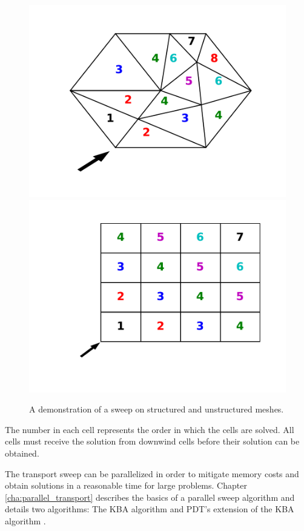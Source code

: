 \begin{figure}[H]
\centering
\includegraphics[scale=0.5]{../figures/UnstructuredMesh.pdf}
\includegraphics[scale = 0.5]{../figures/StructuredMesh.pdf}
\caption{A demonstration of a sweep on structured and unstructured meshes. }
\label{sweeps}
\end{figure}

The number in each cell represents the order in which the cells are solved.
All cells must receive the solution from downwind cells before their solution can be obtained.

The transport sweep can be parallelized in order to mitigate memory costs and obtain solutions in a reasonable time for large problems. Chapter \ref{cha:parallel_transport} describes the basics of a parallel sweep algorithm and details two algorithms: The KBA algorithm \cite{KBA} and PDT's extension of the KBA algorithm \cite{mpadams2013, mpadams2015,mpadamsjcp}.
